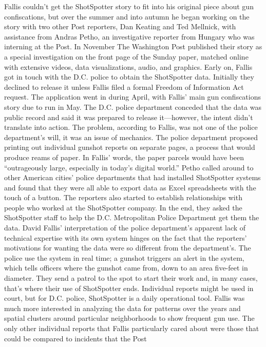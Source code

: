 Fallis couldn't get the ShotSpotter story to fit into his original piece about
gun confiscations, but over the summer and into autumn he began working
on the story with two other Post reporters, Dan Keating and Ted Mellnick,
with assistance from Andras Petho, an investigative reporter from
Hungary who was interning at the Post. In November The Washington Post
published their story as a special investigation on the front page of the
Sunday paper, matched online with extensive videos, data visualizations,
audio, and graphics.
Early on, Fallis got in touch with the D.C. police to obtain the ShotSpotter
data. Initially they declined to release it unless Fallis filed a formal Freedom
of Information Act request. The application went in during April, with Fallis'
main gun confiscations story due to run in May. The D.C. police department
conceded that the data was public record and said it was prepared
to release it—however, the intent didn't translate into action. The problem,
according to Fallis, was not one of the police department's will, it was an
issue of mechanics. The police department proposed printing out individual
gunshot reports on separate pages, a process that would produce reams
of paper. In Fallis' words, the paper parcels would have been ``outrageously
large, especially in today's digital world.'' Petho called around to other
American cities' police departments that had installed ShotSpotter systems
and found that they were all able to export data as Excel spreadsheets with
the touch of a button.
The reporters also started to establish relationships with people who worked
at the ShotSpotter company. In the end, they asked the ShotSpotter staff to
help the D.C. Metropolitan Police Department get them the data.
David Fallis' interpretation of the police department's apparent lack of technical
expertise with its own system hinges on the fact that the reporters'
motivations for wanting the data were so different from the department's.
The police use the system in real time; a gunshot triggers an alert in the
system, which tells officers where the gunshot came from, down to an area
five-feet in diameter. They send a patrol to the spot to start their work and,
in many cases, that's where their use of ShotSpotter ends. Individual reports
might be used in court, but for D.C. police, ShotSpotter is a daily operational
tool.
Fallis was much more interested in analyzing the data for patterns over
the years and spatial clusters around particular neighborhoods to show
frequent gun use. The only other individual reports that Fallis particularly
cared about were those that could be compared to incidents that the Post
